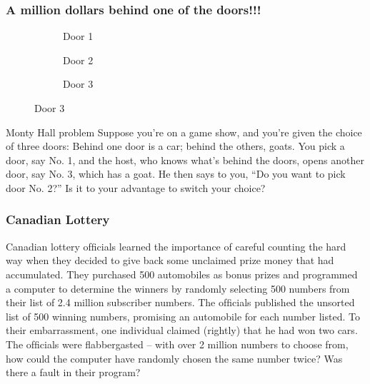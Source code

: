 \documentclass[serif,envcountsect,table,t%
]{beamer}%
\begin{document}
\begin{frame}
  \frametitle{A million dollars behind one of the doors!!!}
  \begin{figure}
    \centering
    \begin{subfigure}{0.32\textwidth}
      \caption{Door 1}
      \protect
    \end{subfigure}
    \begin{subfigure}{0.32\textwidth}
      \caption{Door 2}
      \protect
    \end{subfigure}
    \begin{subfigure}{0.32\textwidth}
      \caption{Door 3}
      \protect
    \end{subfigure}
  \end{figure}
\end{frame}
\begin{frame}{Monty Hall problem}
Suppose you're on a game show, and you're given the choice of three doors:
Behind one door is a car; behind the others, goats. You pick a door, say No. 1,
and the host, who knows what's behind the doors, opens another door, say No. 3,
which has a goat. He then says to you, ``Do you want to pick door No. 2?'' Is it
to your advantage to switch your choice?
\end{frame}
\begin{frame}
  \frametitle{Canadian Lottery}
Canadian lottery ofﬁcials learned the importance of careful counting the hard
way when they decided to give back some unclaimed prize money that had
accumulated. They purchased 500 automobiles as bonus prizes and programmed a
computer to determine the winners by randomly selecting 500 numbers from their
list of 2.4 million subscriber numbers. The ofﬁcials published the unsorted list
of 500 winning numbers, promising an automobile for each number listed. To their
embarrassment, one individual claimed (rightly) that he had won two cars. The
ofﬁcials were ﬂabbergasted – with over 2 million numbers to choose from, how
could the computer have randomly chosen the same number twice? Was there a fault
in their program?
\end{frame}
\end{document}
